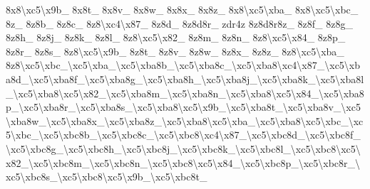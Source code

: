 {8x8\textbackslash{}xc5\textbackslash{}x9b\-\_\- 8x8t\-\_\- 8x8v\-\_\- 8x8w\-\_\- 8x8x\-\_\- 8x8z\-\_\- 8x8\textbackslash{}xc5\textbackslash{}xba\-\_\- 8x8\textbackslash{}xc5\textbackslash{}xbc\-\_\- 8z\-\_\- 8z8b\-\_\- 8z8c\-\_\- 8z8\textbackslash{}xc4\textbackslash{}x87\-\_\- 8z8d\-\_\- 8z8d8r\-\_\- zdr4z 8z8d8r8z\-\_\- 8z8f\-\_\- 8z8g\-\_\- 8z8h\-\_\- 8z8j\-\_\- 8z8k\-\_\- 8z8l\-\_\- 8z8\textbackslash{}xc5\textbackslash{}x82\-\_\- 8z8m\-\_\- 8z8n\-\_\- 8z8\textbackslash{}xc5\textbackslash{}x84\-\_\- 8z8p\-\_\- 8z8r\-\_\- 8z8s\-\_\- 8z8\textbackslash{}xc5\textbackslash{}x9b\-\_\- 8z8t\-\_\- 8z8v\-\_\- 8z8w\-\_\- 8z8x\-\_\- 8z8z\-\_\- 8z8\textbackslash{}xc5\textbackslash{}xba\-\_\- 8z8\textbackslash{}xc5\textbackslash{}xbc\-\_\textbackslash{}xc5\textbackslash{}xba\-\_\textbackslash{}xc5\textbackslash{}xba8b\-\_\textbackslash{}xc5\textbackslash{}xba8c\-\_\textbackslash{}xc5\textbackslash{}xba8\textbackslash{}xc4\textbackslash{}x87\-\_\textbackslash{}xc5\textbackslash{}xba8d\-\_\textbackslash{}xc5\textbackslash{}xba8f\-\_\textbackslash{}xc5\textbackslash{}xba8g\-\_\textbackslash{}xc5\textbackslash{}xba8h\-\_\textbackslash{}xc5\textbackslash{}xba8j\-\_\textbackslash{}xc5\textbackslash{}xba8k\-\_\textbackslash{}xc5\textbackslash{}xba8l\-\_\textbackslash{}xc5\textbackslash{}xba8\textbackslash{}xc5\textbackslash{}x82\-\_\textbackslash{}xc5\textbackslash{}xba8m\-\_\textbackslash{}xc5\textbackslash{}xba8n\-\_\textbackslash{}xc5\textbackslash{}xba8\textbackslash{}xc5\textbackslash{}x84\-\_\textbackslash{}xc5\textbackslash{}xba8p\-\_\textbackslash{}xc5\textbackslash{}xba8r\-\_\textbackslash{}xc5\textbackslash{}xba8s\-\_\textbackslash{}xc5\textbackslash{}xba8\textbackslash{}xc5\textbackslash{}x9b\-\_\textbackslash{}xc5\textbackslash{}xba8t\-\_\textbackslash{}xc5\textbackslash{}xba8v\-\_\textbackslash{}xc5\textbackslash{}xba8w\-\_\textbackslash{}xc5\textbackslash{}xba8x\-\_\textbackslash{}xc5\textbackslash{}xba8z\-\_\textbackslash{}xc5\textbackslash{}xba8\textbackslash{}xc5\textbackslash{}xba\-\_\textbackslash{}xc5\textbackslash{}xba8\textbackslash{}xc5\textbackslash{}xbc\-\_\textbackslash{}xc5\textbackslash{}xbc\-\_\textbackslash{}xc5\textbackslash{}xbc8b\-\_\textbackslash{}xc5\textbackslash{}xbc8c\-\_\textbackslash{}xc5\textbackslash{}xbc8\textbackslash{}xc4\textbackslash{}x87\-\_\textbackslash{}xc5\textbackslash{}xbc8d\-\_\textbackslash{}xc5\textbackslash{}xbc8f\-\_\textbackslash{}xc5\textbackslash{}xbc8g\-\_\textbackslash{}xc5\textbackslash{}xbc8h\-\_\textbackslash{}xc5\textbackslash{}xbc8j\-\_\textbackslash{}xc5\textbackslash{}xbc8k\-\_\textbackslash{}xc5\textbackslash{}xbc8l\-\_\textbackslash{}xc5\textbackslash{}xbc8\textbackslash{}xc5\textbackslash{}x82\-\_\textbackslash{}xc5\textbackslash{}xbc8m\-\_\textbackslash{}xc5\textbackslash{}xbc8n\-\_\textbackslash{}xc5\textbackslash{}xbc8\textbackslash{}xc5\textbackslash{}x84\-\_\textbackslash{}xc5\textbackslash{}xbc8p\-\_\textbackslash{}xc5\textbackslash{}xbc8r\-\_\textbackslash{}xc5\textbackslash{}xbc8s\-\_\textbackslash{}xc5\textbackslash{}xbc8\textbackslash{}xc5\textbackslash{}x9b\-\_\textbackslash{}xc5\textbackslash{}xbc8t\-\_\- }
